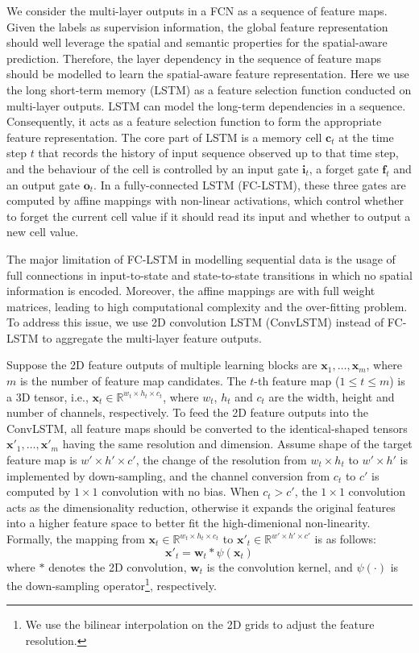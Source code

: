 \documentclass[10pt,twocolumn,twoside]{IEEEtran}
\begin{document}
We consider the multi-layer outputs in a FCN as a sequence of feature maps. Given the labels as supervision information, the global feature representation should well leverage the spatial and semantic properties for the spatial-aware prediction. Therefore, the layer dependency in the sequence of feature maps should be modelled to learn the spatial-aware feature representation. Here we use the long short-term memory (LSTM) as a feature selection function conducted on multi-layer outputs. LSTM can model the long-term dependencies in a sequence. Consequently, it acts as a feature selection function to form the appropriate feature representation. The core part of LSTM is a memory cell $\mathbf{c}_t$ at the time step $t$ that records the history of input sequence observed up to that time step, and the behaviour of the cell is controlled by an input gate $\mathbf{i}_t$, a forget gate $\mathbf{f}_t$ and an output gate $\mathbf{o}_t$. In a fully-connected LSTM (FC-LSTM), these three gates are computed by affine mappings with non-linear activations, which control whether to forget the current cell value if it should read its input and whether to output a new cell value.

The major limitation of FC-LSTM in modelling sequential data is the usage of full connections in input-to-state and state-to-state transitions in which no spatial information is encoded. Moreover, the affine mappings are with full weight matrices, leading to high computational complexity and the over-fitting problem. To address this issue, we use 2D convolution LSTM \cite{NIPS15:CONVLSTM} (ConvLSTM) instead of FC-LSTM to aggregate the multi-layer feature outputs. 

Suppose the 2D feature outputs of multiple learning blocks are $\mathbf{x}_1, \ldots, \mathbf{x}_m$, where $m$ is the number of feature map candidates. The $t$-th feature map ($1\le t \le m$) is a 3D tensor, i.e., $\mathbf{x}_t\in\mathbb{R}^{w_t\times h_t\times c_t}$, where $w_t$, $h_t$ and $c_t$ are the width, height and number of channels, respectively. To feed the 2D feature outputs into the ConvLSTM, all feature maps should be converted to the identical-shaped tensors $\mathbf{x}'_1, \ldots, \mathbf{x}'_m$ having the same resolution and dimension. Assume shape of the target feature map is $w'\times h'\times c'$, the change of the resolution from $w_t\times h_t$ to $w'\times h'$ is implemented by down-sampling, and the channel conversion from $c_t$ to $c'$ is computed by $1\times 1$ convolution with no bias. When $c_t>c'$, the $1\times 1$ convolution acts as the dimensionality reduction, otherwise it expands the original features into a higher feature space to better fit the high-dimenional non-linearity. Formally, the mapping from $\mathbf{x}_t \in \mathbb{R}^{w_t\times h_t\times c_t}$ to $\mathbf{x}'_t \in \mathbb{R}^{w'\times h'\times c'}$ is as follows:
\begin{equation}
\mathbf{x}'_t = \mathbf{w}_t * \psi(\mathbf{x}_t)
\end{equation}
where $*$ denotes the 2D convolution, $\mathbf{w}_t$ is the convolution kernel, and $\psi(\cdot)$ is the down-sampling operator\footnote{We use the bilinear interpolation on the 2D grids to adjust the feature resolution.}, respectively.
\end{document}
